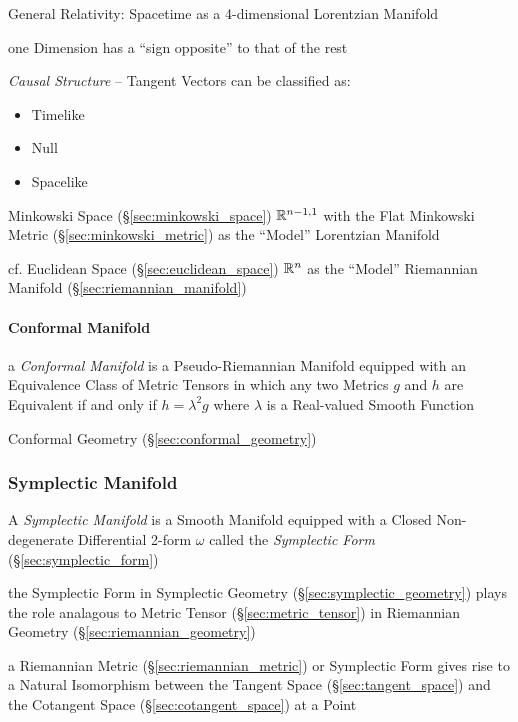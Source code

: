 General Relativity: Spacetime as a 4-dimensional Lorentzian Manifold

one Dimension has a ``sign opposite'' to that of the rest

\emph{Causal Structure} -- Tangent Vectors can be classified as:
\begin{itemize}
  \item Timelike
  \item Null
  \item Spacelike
\end{itemize}

Minkowski Space (\S\ref{sec:minkowski_space}) $\mathbb{R}^{n-1,1}$
with the Flat Minkowski Metric (\S\ref{sec:minkowski_metric}) as the
``Model'' Lorentzian Manifold

cf. Euclidean Space (\S\ref{sec:euclidean_space}) $\mathbb{R}^n$ as the
``Model'' Riemannian Manifold (\S\ref{sec:riemannian_manifold})



\paragraph{Conformal Manifold}\label{sec:conformal_manifold}\hfill

a \emph{Conformal Manifold} is a Pseudo-Riemannian Manifold equipped with an
Equivalence Class of Metric Tensors in which any two Metrics $g$ and $h$ are
Equivalent if and only if $h = \lambda^2 g$ where $\lambda$ is a Real-valued
Smooth Function

\fist Conformal Geometry (\S\ref{sec:conformal_geometry})



\subsubsection{Symplectic Manifold}\label{sec:symplectic_manifold}

A \emph{Symplectic Manifold} is a Smooth Manifold equipped with a Closed
Non-degenerate Differential 2-form $\omega$ called the \emph{Symplectic Form}
(\S\ref{sec:symplectic_form})

the Symplectic Form in Symplectic Geometry (\S\ref{sec:symplectic_geometry})
plays the role analagous to Metric Tensor (\S\ref{sec:metric_tensor}) in
Riemannian Geometry (\S\ref{sec:riemannian_geometry})

a Riemannian Metric (\S\ref{sec:riemannian_metric}) or Symplectic Form gives
rise to a Natural Isomorphism between the Tangent Space
(\S\ref{sec:tangent_space}) and the Cotangent Space
(\S\ref{sec:cotangent_space}) at a Point

